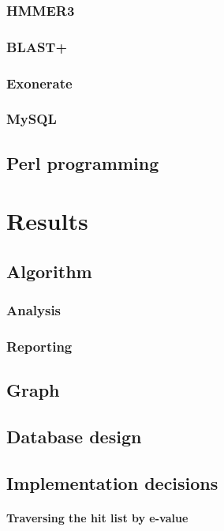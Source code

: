 \documentclass[a4paper,12pt]{scrreprt}
\begin{document}
		\subsection{HMMER3}
			
		\subsection{BLAST+}
			
		\subsection{Exonerate}
			
		\subsection{MySQL}
			
	\section{Perl programming}
		

\chapter{Results}
	
	\section{Algorithm}
		\subsection{Analysis}
			
		\subsection{Reporting}
			
	\section{Graph}
		
	\section{Database design}
		
	\section{Implementation decisions}
		\subsubsection{Traversing the hit list by e-value}
		
\end{document}
